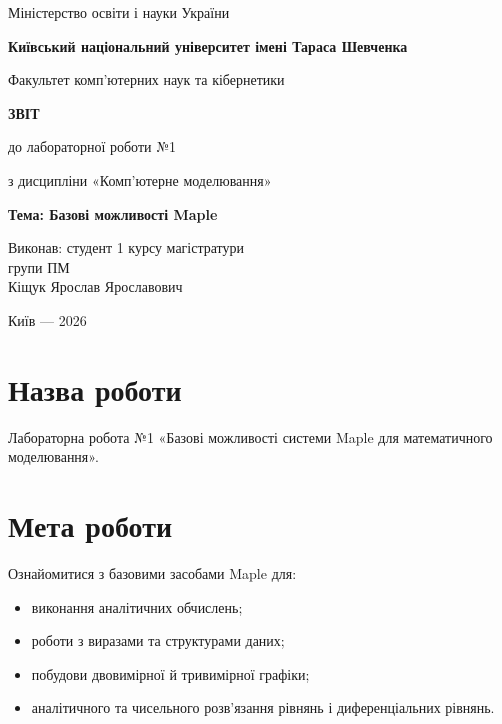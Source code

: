 \documentclass[14pt,a4paper]{extarticle}
\begin{document}
\begin{titlepage}
    \centering
    {\small Міністерство освіти і науки України\par}
    {\small \textbf{Київський національний університет імені Тараса Шевченка}\par}
    {\small Факультет комп'ютерних наук та кібернетики\par}
    \vspace{18mm}

    {\large\bfseries ЗВІТ\par}
    {\large до лабораторної роботи №1\par}
    \vspace{2mm}
    {\large з дисципліни «Комп'ютерне моделювання»\par}
    \vspace{8mm}

    {\Large\bfseries Тема: Базові можливості Maple\par}

    \vfill

    \begin{flushright}
        Виконав: студент 1 курсу магістратури\\
        групи ПМ\\
        Кіщук Ярослав Ярославович
    \end{flushright}

    \vfill
    {\small Київ --- 2026\par}
\end{titlepage}

\section*{Назва роботи}
Лабораторна робота №1 «Базові можливості системи Maple для математичного моделювання».

\section*{Мета роботи}
Ознайомитися з базовими засобами Maple для:
\begin{itemize}
    \item виконання аналітичних обчислень;
    \item роботи з виразами та структурами даних;
    \item побудови двовимірної й тривимірної графіки;
    \item аналітичного та чисельного розв'язання рівнянь і диференціальних рівнянь.
\end{itemize}
\end{document}
